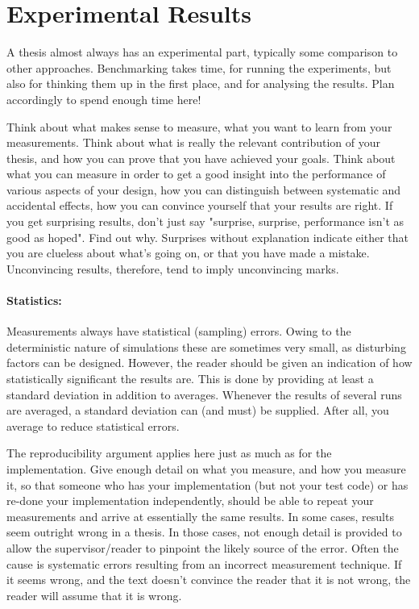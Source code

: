 \documentclass[a4paper,twoside, openright,12pt]{report}
\begin{document}
\section{Experimental Results}

A thesis almost always has an experimental part, typically some comparison to other approaches. Benchmarking takes time, for running the experiments, but also for thinking them up in the first place, and for analysing the results. Plan accordingly to spend enough time here!

Think about what makes sense to measure, what you want to learn from your measurements. Think about what is really the relevant contribution of your thesis, and how you can prove that you have achieved your goals. Think about what you can measure in order to get a good insight into the performance of various aspects of your design, how you can distinguish between systematic and accidental effects, how you can convince yourself that your results are right. If you get surprising results, don't just say "surprise, surprise, performance isn't as good as hoped". Find out why. Surprises without explanation indicate either that you are clueless about what's going on, or that you have made a mistake. Unconvincing results, therefore, tend to imply unconvincing marks. 

\paragraph{Statistics:} Measurements always have statistical (sampling) errors. Owing to the deterministic nature of simulations these are sometimes very small, as disturbing factors can be designed. However, the reader should be given an indication of how statistically significant the results are. This is done by providing at least a standard deviation in addition to averages. Whenever the results of several runs are averaged, a standard deviation can (and must) be supplied. After all, you average to reduce statistical errors.

The reproducibility argument applies here just as much as for the implementation. Give enough detail on what you measure, and how you measure it, so that someone who has your implementation (but not your test code) or has re-done your implementation independently, should be able to repeat your measurements and arrive at essentially the same results. In some cases, results seem outright wrong in a thesis. In those cases, not enough detail is provided to allow the supervisor/reader to pinpoint the likely source of the error. Often the cause is systematic errors resulting from an incorrect measurement technique. If it seems wrong, and the text doesn't convince the reader that it is not wrong, the reader will assume that it is wrong.
\end{document}
